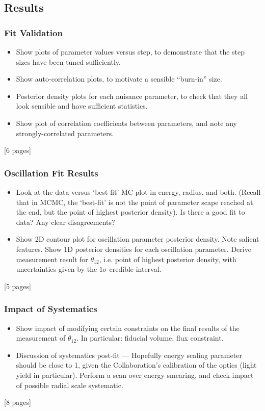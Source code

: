{    \subsection{Results}
    \subsubsection{Fit Validation}
    \begin{itemize}
        \item Show plots of parameter values versus step, to demonstrate that the step sizes have been tuned sufficiently.
        \item Show auto-correlation plots, to motivate a sensible ``burn-in'' size.
        \item Posterior density plots for each nuisance parameter, to check that they all look sensible and have sufficient statistics.
        \item Show plot of correlation coefficients between parameters, and note any strongly-correlated parameters.
    \end{itemize}
    [6 pages]
    \subsubsection{Oscillation Fit Results}
    \begin{itemize}
        \item Look at the data versus `best-fit' MC plot in energy, radius, and both. (Recall that in MCMC, the `best-fit' is not the point of parameter scape reached at the end, but the point of highest posterior density). Is there a good fit to data? Any clear disagreements?
        \item Show 2D contour plot for oscillation parameter posterior density. Note salient features. Show 1D posterior densities for each oscillation parameter. Derive measurement result for $\theta_{12}$, i.e. point of highest posterior density, with uncertainties given by the $1\sigma$ credible interval.
    \end{itemize}
    [5 pages]
    \subsubsection{Impact of Systematics}
    \begin{itemize}
        \item Show impact of modifying certain constraints on the final results of the measurement of $\theta_{12}$. In particular: fiducial volume, \beight{} flux constraint.
        \item Discussion of systematics post-fit --- Hopefully energy scaling parameter should be close to 1, given the Collaboration's calibration of the optics (light yield in particular). Perform a scan over energy smearing, and check impact of possible radial scale systematic.
    \end{itemize}
    [8 pages]
    
}
